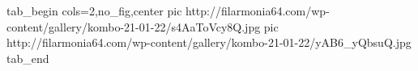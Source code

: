  
 
 
 
 

\ifcmt
  tab_begin cols=2,no_fig,center
     pic http://filarmonia64.com/wp-content/gallery/kombo-21-01-22/s4AaToVcy8Q.jpg
		 pic http://filarmonia64.com/wp-content/gallery/kombo-21-01-22/yAB6_yQbsuQ.jpg
  tab_end
\fi

